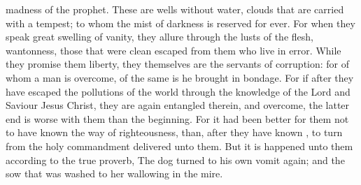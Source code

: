 {madness of the
prophet.
These
are
wells without
water,
clouds that are
carried
with a
tempest; to
whom the
mist of
darkness is
reserved
for
ever.
For when they
speak great
swelling
{} of
vanity, they
allure
through the
lusts of the
flesh,
{}
wantonness, those that were
clean
escaped from them who
live
in
error.
While they
promise
them
liberty, they
themselves
are the
servants of
corruption:
for of
whom a
man is
overcome, of the
same is he brought in
bondage.
For
if after they have
escaped the
pollutions of the
world
through the
knowledge of the
Lord
and
Saviour
Jesus
Christ, they
are
again
entangled
therein, and
overcome, the latter
end
is
worse with
them than the
beginning.
For it had
been
better for
them
not to have
known the
way of
righteousness,
than, after they have
known
{}, to
turn
from
the
holy
commandment
delivered unto
them.
But it is
happened unto
them according to
the
true
proverb, The
dog
{}
turned
to his
own
vomit
again;
and the
sow that was
washed
to her
wallowing in the
mire.

}
